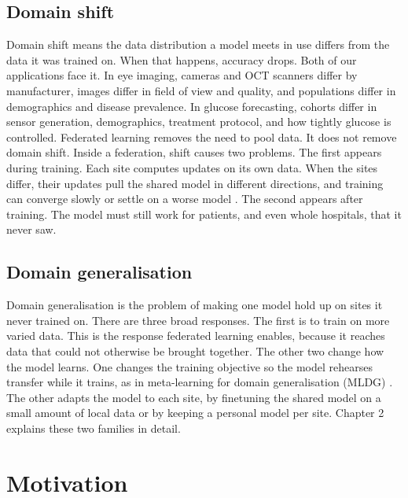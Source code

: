 
\subsection{Domain shift}
\label{sec:intro-shift}

Domain shift means the data distribution a model meets in use differs from the data it was trained on. When that happens, accuracy drops. Both of our applications face it. In eye imaging, cameras and OCT scanners differ by manufacturer, images differ in field of view and quality, and populations differ in demographics and disease prevalence. In glucose forecasting, cohorts differ in sensor generation, demographics, treatment protocol, and how tightly glucose is controlled. Federated learning removes the need to pool data. It does not remove domain shift. Inside a federation, shift causes two problems. The first appears during training. Each site computes updates on its own data. When the sites differ, their updates pull the shared model in different directions, and training can converge slowly or settle on a worse model \citep{li2020fedprox}. The second appears after training. The model must still work for patients, and even whole hospitals, that it never saw.

\subsection{Domain generalisation}
\label{sec:intro-dg}

Domain generalisation is the problem of making one model hold up on sites it never trained on. There are three broad responses. The first is to train on more varied data. This is the response federated learning enables, because it reaches data that could not otherwise be brought together. The other two change how the model learns. One changes the training objective so the model rehearses transfer while it trains, as in meta-learning for domain generalisation (MLDG) \citep{li2018mldg}. The other adapts the model to each site, by finetuning the shared model on a small amount of local data or by keeping a personal model per site. Chapter 2 explains these two families in detail.

\section{Motivation}
\label{sec:intro-motivation}

